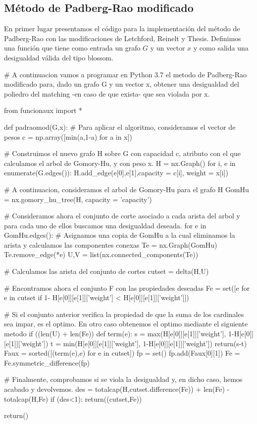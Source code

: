 \documentclass[twoside,a4paper,openright,12pt,tikz]{book}
\begin{document}
\subsection{Método de Padberg-Rao modificado}
En primer lugar presentamos el código para la implementación del método de Padberg-Rao con las modificaciones de Letchford, Reinelt y Thesis. Definimos una función que tiene como entrada un grafo $G$ y un vector $x$ y como salida una desigualdad válida del tipo blossom. 
\begin{pythone}
# A continuacion vamos a programar en Python 3.7 el metodo de Padberg-Rao modificado para, dado un grafo G y un vector x, obtener una desigualdad del poliedro del matching -en caso de que exista- que sea violada por x.

from funcionaux import *

def padraomod(G,x):
    # Para aplicar el algoritmo, consideramos el vector de pesos
    c = np.array([min(a,1-a) for a in x])
    
    # Construimos el nuevo grafo H sobre G con capacidad c, atributo con el que calculamos el arbol de Gomory-Hu, y con peso x.
    H = nx.Graph()
    for i, e in enumerate(G.edges()):
        H.add_edge(e[0],e[1],capacity = c[i], weight = x[i])
        
    # A continuacion, consideramos el arbol de Gomory-Hu para el grafo H
    GomHu = nx.gomory_hu_tree(H, capacity = 'capacity')
    
    
    # Consideramos ahora el conjunto de corte asociado a cada arista del arbol y para cada uno de ellos buscamos una desigualdad deseada.
    for e in GomHu.edges():
        # Asignamos una copia de GomHu a la cual eliminamos la arista y calculamos las componentes conexas
        Te = nx.Graph(GomHu)
        Te.remove_edge(*e)
        U,V = list(nx.connected_components(Te))
        
        # Calculamos las arista del conjunto de cortes
        cutset = delta(H,U)
        
        #  Encontramos ahora el conjunto F con las propiedades deseadas 
        Fe = set([e for e in cutset if 1- H[e[0]][e[1]]['weight'] < 
              H[e[0]][e[1]]['weight']])
        
        # Si el conjunto anterior verifica la propiedad de que la suma de los cardinales sea impar, es el optimo. En otro caso obtenemos el optimo mediante el siguiente metodo
        if ((len(U) + len(Fe)) %
            def term(e):
                s = max(H[e[0]][e[1]]['weight'],
              	  1-H[e[0]][e[1]]['weight'])
                t = min(H[e[0]][e[1]]['weight'],
             	   1-H[e[0]][e[1]]['weight'])
                return(s-t)
            Faux = sorted([(term(e),e) for e in cutset])
            fp = set()
            fp.add(Faux[0][1])
            Fe = Fe.symmetric_difference(fp)
        
        # Finalmente, comprobamos si se viola la desigualdad y, en dicho caso, hemos acabado y devolvemos.
        des = totalcap(H,cutset.difference(Fe)) + len(Fe) - totalcap(H,Fe)
        if (des<1):
            return((cutset,Fe))
          
    return()
\end{pythone}
\newpage
\end{document}
